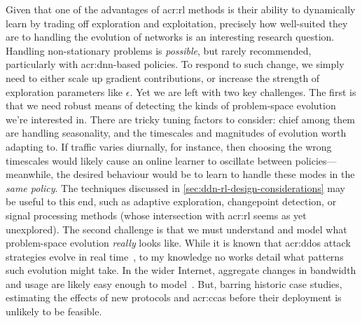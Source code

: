 Given that one of the advantages of \gls{acr:rl} methods is their ability to dynamically learn by trading off exploration and exploitation, precisely how well-suited they are to handling the evolution of networks is an interesting research question.
Handling non-stationary problems is \emph{possible}, but rarely recommended, particularly with \gls{acr:dnn}-based policies.
To respond to such change, we simply need to either scale up gradient contributions, or increase the strength of exploration parameters like $\epsilon$.
Yet we are left with two key challenges.
The first is that we need robust means of detecting the kinds of problem-space evolution we're interested in.
There are tricky tuning factors to consider: chief among them are handling seasonality, and the timescales and magnitudes of evolution worth adapting to.
If traffic varies diurnally, for instance, then choosing the wrong timescales would likely cause an online learner to oscillate between policies---meanwhile, the desired behaviour would be to learn to handle these modes in the \emph{same policy}.
The techniques discussed in \cref{sec:ddn-rl-design-considerations} may be useful to this end, such as adaptive exploration, changepoint detection, or signal processing methods (whose intersection with \gls{acr:rl} seems as yet unexplored).
The second challenge is that we must understand and model what problem-space evolution \emph{really} looks like.
While it is known that \gls{acr:ddos} attack strategies evolve in real time~\parencite{DBLP:conf/spw/KangGS16}, to my knowledge no works detail what patterns such evolution might take.
In the wider Internet, aggregate changes in bandwidth and usage are likely easy enough to model~\parencite{DBLP:conf/anrw/BauerJHBC21}.
But, barring historic case studies, estimating the effects of new protocols and \glspl{acr:cca} before their deployment is unlikely to be feasible.


